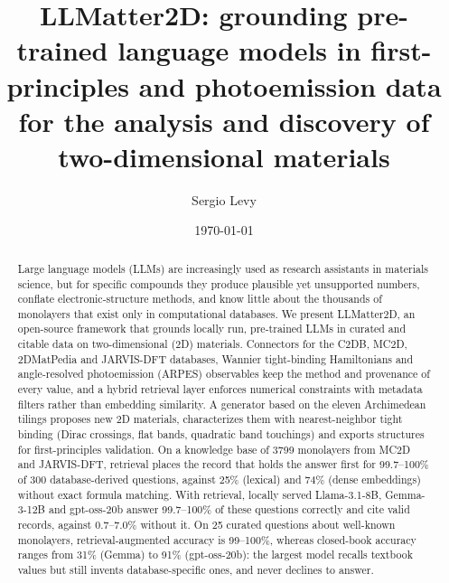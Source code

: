 \documentclass[prmaterials,twocolumn,superscriptaddress,longbibliography,nofootinbib]{revtex4-2}
\begin{document}
\title{LLMatter2D: grounding pre-trained language models in first-principles and
photoemission data for the analysis and discovery of two-dimensional materials}

\author{Sergio Levy}

\date{\today}

\begin{abstract}
Large language models (LLMs) are increasingly used as research assistants in materials
science, but for specific compounds they produce plausible yet unsupported numbers, conflate
electronic-structure methods, and know little about the thousands of monolayers that exist
only in computational databases. We present LLMatter2D, an open-source framework that
grounds locally run, pre-trained LLMs in curated and citable data on two-dimensional (2D)
materials. Connectors for the C2DB, MC2D, 2DMatPedia and JARVIS-DFT databases, Wannier
tight-binding Hamiltonians and angle-resolved photoemission (ARPES) observables keep the
method and provenance of every value, and a hybrid retrieval layer enforces numerical
constraints with metadata filters rather than embedding similarity. A generator based on the
eleven Archimedean tilings proposes new 2D materials, characterizes them with
nearest-neighbor tight binding (Dirac crossings, flat bands, quadratic band touchings) and
exports structures for first-principles validation. On a knowledge base of 3799 monolayers
from MC2D and JARVIS-DFT, retrieval places the record that holds the answer first for
99.7--100\% of 300 database-derived questions, against 25\% (lexical) and 74\% (dense
embeddings) without exact formula matching. With retrieval, locally served Llama-3.1-8B,
Gemma-3-12B and gpt-oss-20b answer 99.7--100\% of these questions correctly and cite valid
records, against 0.7--7.0\% without it. On 25 curated questions about well-known monolayers,
retrieval-augmented accuracy is 99--100\%, whereas closed-book accuracy ranges from 31\%
(Gemma) to 91\% (gpt-oss-20b): the largest model recalls textbook values but still invents
database-specific ones, and never declines to answer.
\end{abstract}

\maketitle

\end{document}
